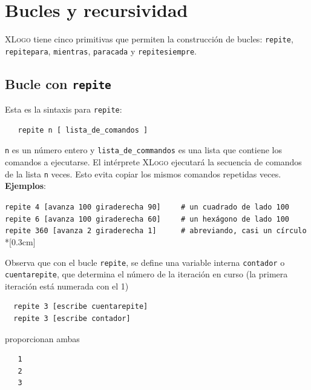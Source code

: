 \chapter{Bucles y recursividad}
   \label{Bucles}

\textsc{XLogo} tiene cinco primitivas que permiten la construcci\'on
de bucles: \texttt{repite},
\texttt{repitepara},
\texttt{mientras},
\texttt{paracada} y
\texttt{repitesiempre}.

\section{Bucle con \texttt{repite}}
   \label{Bucle-con-repite}

Esta es la sintaxis para \texttt{repite}:
\begin{verbatim}
   repite n [ lista_de_comandos ] \end{verbatim}
\texttt{n} es un n\'umero entero y \texttt{lista\_de\_commandos} es
una lista que contiene los comandos a ejecutarse. El int\'erprete
\textsc{XLogo} ejecutar\'a la secuencia de comandos de la lista
\texttt{n} veces. Esto evita copiar los mismos comandos repetidas
veces. \\ 

\noindent \textbf{Ejemplos}:

\texttt{repite 4 [avanza 100 giraderecha 90]}\verb+    +
     \texttt{\# un cuadrado de lado 100} \\

\texttt{repite 6 [avanza 100 giraderecha 60]}\verb+    +
     \texttt{\# un hex\'agono de lado 100} \\

\texttt{repite 360 [avanza 2 giraderecha 1]}\verb+     +
     \texttt{\# abreviando, casi un c\'irculo} \\*[0.3cm]

\noindent Observa que con el bucle \texttt{repite}, se define una variable interna
\texttt{contador}  o
\texttt{cuentarepite}, 
que determina el n\'umero de la iteraci\'on en curso (la primera iteraci\'on
est\'a numerada con el 1)

\begin{verbatim}
  repite 3 [escribe cuentarepite]
  repite 3 [escribe contador] \end{verbatim}
   proporcionan ambas
   \begin{verbatim}
   1
   2
   3 \end{verbatim}

